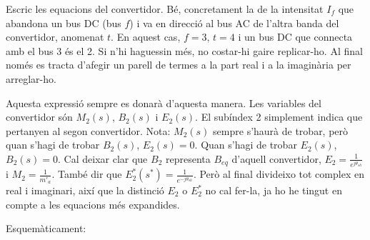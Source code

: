 \documentclass[11pt]{article}
\begin{document}
Escric les equacions del convertidor. Bé, concretament la de la intensitat $I_f$ que abandona un bus DC (bus $f$) i va en direcció al bus AC de l'altra banda del convertidor, anomenat $t$. En aquest cas, $f=3$, $t=4$ i un bus DC que connecta amb el bus 3 és el 2. Si n'hi haguessin més, no costar-hi gaire replicar-ho. Al final només es tracta d'afegir un parell de termes a la part real i a la imaginària per arreglar-ho.

Aquesta expressió sempre es donarà d'aquesta manera. Les variables del convertidor són $M_2(s)$, $B_2(s)$ i $E_2(s)$. El subíndex 2 simplement indica que pertanyen al segon convertidor. Nota: $M_2(s)$ sempre s'haurà de trobar, però quan s'hagi de trobar $B_2(s)$, $E_2(s)=0$. Quan s'hagi de trobar $E_2(s)$, $B_2(s)=0$. Cal deixar clar que $B_2$ representa $B_{eq}$ d'aquell convertidor, $E_2=\frac{1}{e^{j\theta_{sh}}}$ i $M_2=\frac{1}{m'_a}$. També dir que $E^*_2(s^*)=\frac{1}{e^{-j\theta_{sh}}}$. Però al final divideixo tot complex en real i imaginari, així que la distinció $E_2$ o $E^*_2$ no cal fer-la, ja ho he tingut en compte a les equacions més expandides.

Esquemàticament:
\end{document}
